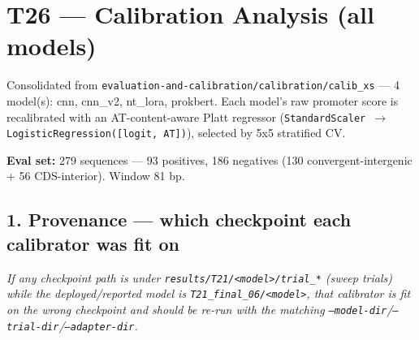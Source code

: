 \documentclass[10pt]{article}
\begin{document}
\section*{T26 --- Calibration Analysis (all models)}

Consolidated from \texttt{evaluation-and-calibration/calibration/calib\_xs} --- 4 model(s): cnn, cnn\_v2, nt\_lora, prokbert. Each model's raw promoter score is recalibrated with an AT-content-aware Platt regressor (\texttt{StandardScaler $\to$ LogisticRegression([logit, AT])}), selected by 5x5 stratified CV.

\textbf{Eval set:} 279 sequences --- 93 positives, 186 negatives (130 convergent-intergenic + 56 CDS-interior). Window 81 bp.

\subsection*{1. Provenance --- which checkpoint each calibrator was fit on}

\begin{center}
\end{center}

{\itshape If any checkpoint path is under \texttt{results/T21/<model>/trial\_*} (sweep trials) while the deployed/reported model is \texttt{T21\_final\_06/<model>}, that calibrator is fit on the wrong checkpoint and should be re-run with the matching \texttt{--model-dir}/\texttt{--trial-dir}/\texttt{--adapter-dir}.\par}
\end{document}
